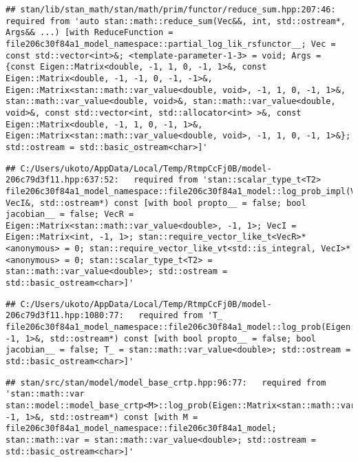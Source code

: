 \documentclass[
]{article}
\begin{document}
\begin{verbatim}
## stan/lib/stan_math/stan/math/prim/functor/reduce_sum.hpp:207:46:   required from 'auto stan::math::reduce_sum(Vec&&, int, std::ostream*, Args&& ...) [with ReduceFunction = file206c30f84a1_model_namespace::partial_log_lik_rsfunctor__; Vec = const std::vector<int>&; <template-parameter-1-3> = void; Args = {const Eigen::Matrix<double, -1, 1, 0, -1, 1>&, const Eigen::Matrix<double, -1, -1, 0, -1, -1>&, Eigen::Matrix<stan::math::var_value<double, void>, -1, 1, 0, -1, 1>&, stan::math::var_value<double, void>&, stan::math::var_value<double, void>&, const std::vector<int, std::allocator<int> >&, const Eigen::Matrix<double, -1, 1, 0, -1, 1>&, Eigen::Matrix<stan::math::var_value<double, void>, -1, 1, 0, -1, 1>&}; std::ostream = std::basic_ostream<char>]'
\end{verbatim}

\begin{verbatim}
## C:/Users/ukoto/AppData/Local/Temp/RtmpCcFj0B/model-206c79d3f11.hpp:637:52:   required from 'stan::scalar_type_t<T2> file206c30f84a1_model_namespace::file206c30f84a1_model::log_prob_impl(VecR&, VecI&, std::ostream*) const [with bool propto__ = false; bool jacobian__ = false; VecR = Eigen::Matrix<stan::math::var_value<double>, -1, 1>; VecI = Eigen::Matrix<int, -1, 1>; stan::require_vector_like_t<VecR>* <anonymous> = 0; stan::require_vector_like_vt<std::is_integral, VecI>* <anonymous> = 0; stan::scalar_type_t<T2> = stan::math::var_value<double>; std::ostream = std::basic_ostream<char>]'
\end{verbatim}

\begin{verbatim}
## C:/Users/ukoto/AppData/Local/Temp/RtmpCcFj0B/model-206c79d3f11.hpp:1080:77:   required from 'T_ file206c30f84a1_model_namespace::file206c30f84a1_model::log_prob(Eigen::Matrix<T_job_param, -1, 1>&, std::ostream*) const [with bool propto__ = false; bool jacobian__ = false; T_ = stan::math::var_value<double>; std::ostream = std::basic_ostream<char>]'
\end{verbatim}

\begin{verbatim}
## stan/src/stan/model/model_base_crtp.hpp:96:77:   required from 'stan::math::var stan::model::model_base_crtp<M>::log_prob(Eigen::Matrix<stan::math::var_value<double>, -1, 1>&, std::ostream*) const [with M = file206c30f84a1_model_namespace::file206c30f84a1_model; stan::math::var = stan::math::var_value<double>; std::ostream = std::basic_ostream<char>]'
\end{verbatim}
\end{document}
